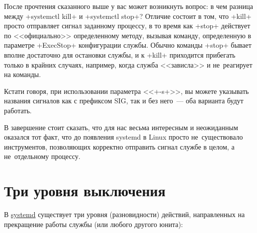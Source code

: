 \documentclass[10pt,oneside,a4paper]{article}
\begin{document}
После прочтения сказанного выше у вас может возникнуть вопрос: в чем разница
между +systemctl kill+ и +systemctl stop+? Отличие состоит в том,
что +kill+ просто отправляет сигнал заданному процессу, в то время как
+stop+ действует по <<официально>> определенному методу, вызывая команду,
определенную в параметре +ExecStop+ конфигурации службы. Обычно команды
+stop+ бывает вполне достаточно для остановки службы, и к +kill+
приходится прибегать только в крайних случаях, например, когда служба
<<зависла>> и не~реагирует на команды.

Кстати говоря, при использовании параметра <<+-s+>>, вы можете указывать
названия сигналов как с префиксом SIG, так и без него~--- оба варианта будут
работать.

В завершение стоит сказать, что для нас весьма интересным и неожиданным
оказался тот факт, что до появления systemd в Linux просто не~существовало
инструментов, позволяющих корректно отправить сигнал службе в целом, а
не~отдельному процессу.

\section{Три уровня выключения}

В \href{http://www.freedesktop.org/wiki/Software/systemd}{systemd} существует
три уровня (разновидности) действий, направленных на прекращение работы службы
(или любого другого юнита):
\end{document}
